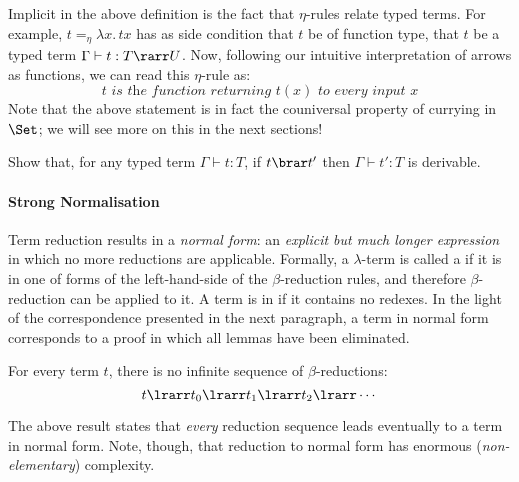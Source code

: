 \documentclass[12pt]{article}
\begin{document}
%
Implicit in the above definition is the fact that $\eta$-rules relate typed terms. For example, $t=_\eta\lambda x.\,tx$ has as side condition that $t$ be of function type, \ie that $t$ be a typed term $\Gamma\vdash t:T\rarr U$.
Now, following our intuitive interpretation of arrows as functions, we can read this $\eta$-rule as:
\[ \textit{$t$ is the function returning $t(x)$ to every input $x$}\]
Note that the above statement is in fact the couniversal property of currying in $\Set$; we will see more on this in the next sections!
%
\begin{myexercise}[Subject Reduction]
    Show that, for any typed term $\Gamma\vdash t:T$, if $t\brar t'$ then $\Gamma\vdash t':T$ is derivable.
\end{myexercise}

\paragraph{Strong Normalisation} Term reduction results in a \emph{normal form}: an \emph{explicit but much longer expression} in which
no more reductions are applicable.
%
Formally, a $\lambda$-term is called a  if it is in one of forms of the left-hand-side of the $\beta$-reduction rules,
and therefore $\beta$-reduction can be applied to it. A term is in  if it contains no redexes.
In the light of the correspondence presented in the next paragraph, a term in normal form corresponds to a proof in which all lemmas have been eliminated.
\begin{fact}[SN]
For every term $t$, there is no infinite sequence of $\beta$-reductions:
\[ t\lrarr t_0\lrarr t_1\lrarr t_2\lrarr \cdots \]
\end{fact}
%
The above result states that \emph{every} reduction sequence leads eventually to a term in normal form. Note, though,
that reduction to normal form has enormous (\emph{non-elementary}) complexity.
\end{document}
